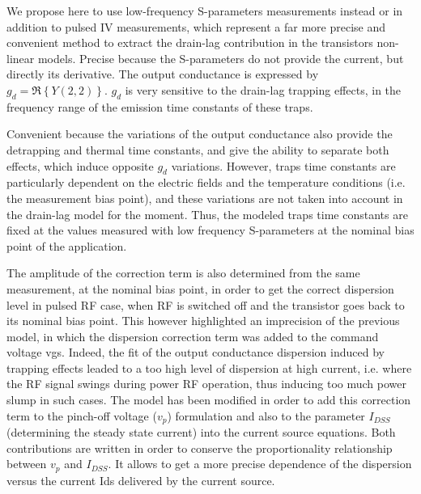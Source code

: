 \documentclass[conference]{IEEEtran}
\begin{document}
We propose here to use low-frequency S-parameters measurements \cite{elrafei} instead or in addition to pulsed IV measurements, which represent a far more precise and convenient method to extract the drain-lag contribution in the transistors non-linear models. Precise because the S-parameters do not provide the current, but directly its derivative. The output conductance is expressed by $g_d=\Re \left\{Y(2,2)\right\}$. $g_d$ is very sensitive to the drain-lag trapping effects, in the frequency range of the emission time constants of these traps.

Convenient because the variations of the output conductance also provide the detrapping and thermal time constants, and give the ability to separate both effects, which induce opposite $g_d$ variations. However, traps time constants are particularly dependent on the electric fields and the temperature conditions (i.e. the measurement bias point), and these variations are not taken into account in the drain-lag model for the moment. Thus, the modeled traps time constants are fixed at the values measured with low frequency S-parameters at the nominal bias point of the application.

The amplitude of the correction term is also determined from the same measurement, at the nominal bias point, in order to get the correct dispersion level in pulsed RF case, when RF is switched off and the transistor goes back to its nominal bias point. This however highlighted an imprecision of the previous model, in which the dispersion correction term was added to the command voltage vgs. Indeed, the fit of the output conductance dispersion induced by trapping effects leaded to a too high level of dispersion at high current, i.e. where the RF signal swings during power RF operation, thus inducing too much power slump in such cases. The model has been modified in order to add this correction term to the pinch-off voltage ($v_p$) formulation and also to the parameter $I_{DSS}$ (determining the steady state current) into the current source equations. Both contributions are written in order to conserve the proportionality relationship between $v_p$ and $I_{DSS}$. It allows to get a more precise dependence of the dispersion versus the current Ids delivered by the current source.
\end{document}
